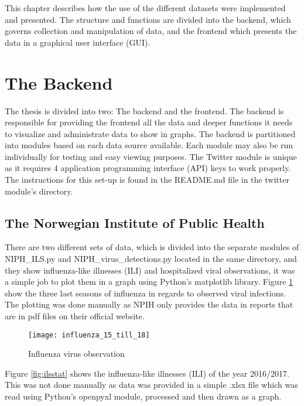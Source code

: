 This chapter describes how the use of the different datasets were implemented and presented. The structure and functions are divided into the backend, which governs collection and manipulation of data, and the frontend which presents the data in a graphical user interface (GUI).

\section{The Backend}
The thesis is divided into two: The backend and the frontend. The backend is responsible for providing the frontend all the data and deeper functions it needs to visualize and administrate data to show in graphs. The backend is partitioned into modules based on each data source available. Each module may also be run individually for testing and easy viewing purposes. The Twitter module is unique as it requires 4 application programming interface (API) keys to work properly. The instructions for this set-up is found in the README.md file in the twitter module's directory.







\subsection{The Norwegian Institute of Public Health}
There are two different sets of data, which is divided into the separate modules of NIPH\_ILS.py and NIPH\_virus\_detections.py located in the same directory, and they show influenza-like illnesses (ILI) and hospitalized viral observations, it was a simple job to plot them in a graph using Python's matplotlib library. Figure \ref{fig:infstat} show the three last seasons of influenza in regards to observed viral infections. The plotting was done manually as NPIH only provides the data in reports that are in pdf files on their official website\cite{fhi}.

\begin{figure}[h]
\texttt{[image: influenza\_15\_till\_18]}
\centering
\caption{Influenza virus observation}
\label{fig:infstat}
\end{figure}

Figure \ref{fig:ilsstat} shows the influenza-like illnesses (ILI) of the year 2016/2017. This was not done manually as data was provided in a simple .xlsx file which was read using Python's openpyxl module, processed and then drawn as a graph.

